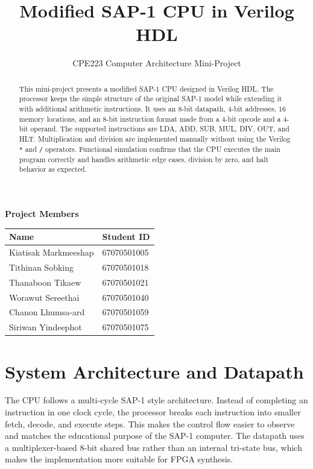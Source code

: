 \documentclass[12pt,a4paper]{article}
\title{\textbf{Modified SAP-1 CPU in Verilog HDL}}
\author{CPE223 Computer Architecture Mini-Project}
\date{}
\begin{document}
\maketitle

\begin{center}
\textbf{Project Members}

\vspace{0.5em}
\begin{tabular}{l l}
\toprule
Name & Student ID \\
\midrule
Kiatisak Markmeeshap & 67070501005 \\
Tithinan Sobking & 67070501018 \\
Thanaboon Tikaew & 67070501021 \\
Worawut Sereethai & 67070501040 \\
Chanon Lhumsa-ard & 67070501059 \\
Siriwan Yindeephot & 67070501075 \\
\bottomrule
\end{tabular}
\end{center}

\begin{abstract}
This mini-project presents a modified SAP-1 CPU designed in Verilog HDL. The processor keeps the simple structure of the original SAP-1 model while extending it with additional arithmetic instructions. It uses an 8-bit datapath, 4-bit addresses, 16 memory locations, and an 8-bit instruction format made from a 4-bit opcode and a 4-bit operand. The supported instructions are LDA, ADD, SUB, MUL, DIV, OUT, and HLT. Multiplication and division are implemented manually without using the Verilog \texttt{*} and \texttt{/} operators. Functional simulation confirms that the CPU executes the main program correctly and handles arithmetic edge cases, division by zero, and halt behavior as expected.
\end{abstract}

\section{System Architecture and Datapath}

The CPU follows a multi-cycle SAP-1 style architecture. Instead of completing an instruction in one clock cycle, the processor breaks each instruction into smaller fetch, decode, and execute steps. This makes the control flow easier to observe and matches the educational purpose of the SAP-1 computer. The datapath uses a multiplexer-based 8-bit shared bus rather than an internal tri-state bus, which makes the implementation more suitable for FPGA synthesis.
\end{document}
